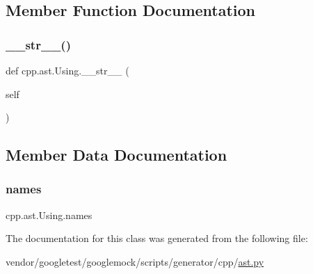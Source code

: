 \subsection{Member Function Documentation}
\mbox{\label{classcpp_1_1ast_1_1_using_ac209e8e5d84988d14a8f4b30377e5455}} 
\subsubsection{\texorpdfstring{\+\_\+\+\_\+str\+\_\+\+\_\+()}{\_\_str\_\_()}}
{\footnotesize\ttfamily def cpp.\+ast.\+Using.\+\_\+\+\_\+str\+\_\+\+\_\+ (\begin{DoxyParamCaption}\item[{}]{self }\end{DoxyParamCaption})}



\subsection{Member Data Documentation}
\mbox{\label{classcpp_1_1ast_1_1_using_abc05dedb59eb83857d373cc0e64eccb3}} 
\subsubsection{\texorpdfstring{names}{names}}
{\footnotesize\ttfamily cpp.\+ast.\+Using.\+names}



The documentation for this class was generated from the following file\+:\begin{DoxyCompactItemize}
\item 
vendor/googletest/googlemock/scripts/generator/cpp/\hyperlink{ast_8py}{ast.\+py}\end{DoxyCompactItemize}
